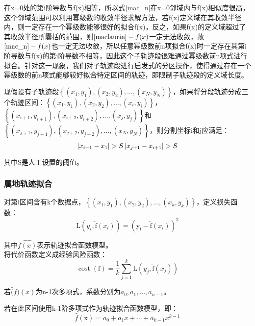 在x=0处的第i阶导数与f(x)相等，所以式\ref{mac_n}在x=0邻域内与f(x)相似度很高，这个邻域范围可以利用幂级数的收敛半径求解方法，若f(x)定义域在其收敛半径内，则一定存在一个幂级数能够很好的拟合f(x)，反之，如果f(x)的定义域超过了其收敛半径所囊括的范围，则$\ref{maclaurin}-f(x)$一定无法收敛，故$\ref{mac_n}-f(x)$也一定无法收敛，所以任意幂级数前n项拟合f(x)时一定存在其第i阶导数与f(x)的第i阶导数不相等，因此这个子轨迹段很难通过幂级数前n项式进行拟合。针对这一现象，我们对子轨迹段进行启发式的分区操作，使得通过存在一个幂级数的前n项式能够较好拟合特定区间的轨迹，即限制子轨迹段的定义域长度。

现假设有子轨迹段$\left\{\left(x_{1}, y_{1}\right),\left(x_{2}, y_{2}\right), \dots,\left(x_{N}, y_{N}\right)\right\}$，如果将分段轨迹分成三个轨迹区间：$\left\{\left(x_{1}, y_{1}\right),\left(x_{2}, y_{2}\right), \dots,\left(x_{i}, y_{i}\right)\right\}$，$\left\{\left(x_{i+1}, y_{i+1}\right),\left(x_{i+2}, y_{i+2}\right), \ldots,\left(x_{j}, y_{j}\right)\right\}$和$\left\{\left(x_{j+1}, y_{j+1}\right),\left(x_{j+2}, y_{j+2}\right), \dots,\left(x_{N}, y_{N}\right)\right\}$，则分割坐标i和j应满足：
\[
\left|x_{i+1}-x_{1}\right|>S\\
\left|x_{j+1}-x_{i+1}\right|>S
\]

其中S是人工设置的阈值。

\subsubsection{属地轨迹拟合}
对第i区间含有k个数据点，$\left\{\left(x_{1}, y_{1}\right),\left(x_{2}, y_{2}\right), \ldots,\left(x_{k}, y_{k}\right)\right\}$，定义损失函数：
\[
\mathrm{L}\left(y_{i}, \mathrm{\hat{f}}\left(x_{i}\right)\right)=\left(\mathrm{y_i}-\mathrm{\hat{f}}\left(x_{i}\right)\right)^{2}
\]

其中$\hat{f(x)}$表示轨迹拟合函数模型。\\
将代价函数定义成经验风险函数：
\begin{equation}
\label{ch3costwithoutl1}
\operatorname{cost}(\mathrm{f})=\frac{1}{k} \sum_{j=1}^{k} \mathrm{L}\left(y_{j}, \mathrm{\hat{f}}\left(x_{j}\right)\right)
\end{equation}

若$\hat(f)(x)$为n-1次多项式，系数分别为$a_0,a_1,…,a_{n-1}$。

若在此区间使用k-1阶多项式作为轨迹拟合函数模型，即：
\[
\hat{f}\left( \text{x} \right) =a_0+a_1x+\cdots +a_{k-1}x^{k-1}
\]

